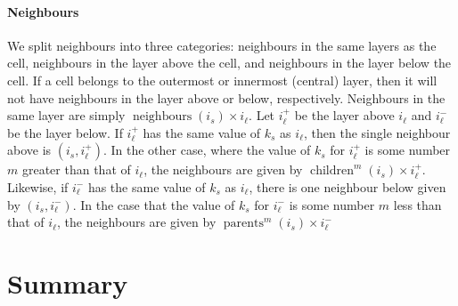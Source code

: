 \paragraph{Neighbours} We split neighbours into three categories: neighbours in the same layers as the cell, neighbours in the layer above the cell, and neighbours in the layer below the cell.
If a cell belongs to the outermost or innermost (central) layer, then it will not have neighbours in the layer above or below, respectively.
Neighbours in the same layer are simply $\operatorname{neighbours}(i_s) \times i_\ell$.
Let $i_\ell^+$ be the layer above $i_\ell$ and $i_\ell^-$ be the layer below.
If $i_\ell^+$ has the same value of $k_s$ as $i_\ell$, then the single neighbour above is $(i_s, i_\ell^+)$.
In the other case, where the value of $k_s$ for $i_\ell^+$ is some number $m$ greater than that of $i_\ell$, the neighbours are given by $\operatorname{children}^m(i_s) \times i_\ell^+$.
Likewise, if $i_\ell^-$ has the same value of $k_s$ as $i_\ell$, there is one neighbour below given by $(i_s, i_\ell^-)$.
In the case that the value of $k_s$ for $i_\ell^-$ is some number $m$ less than that of $i_\ell$, the neighbours are given by $\operatorname{parents}^m(i_s) \times i_\ell^-$

\section{Summary}